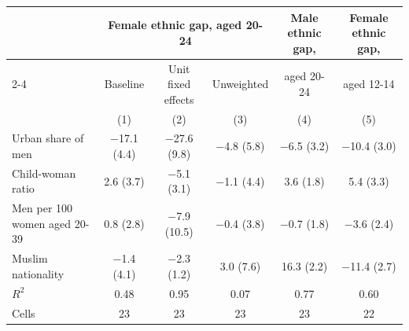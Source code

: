 \begin{tabular}{lccccc}
\toprule
 & \multicolumn{3}{c}{Female ethnic gap, aged 20-24} & Male ethnic gap, & Female ethnic gap, \\
\cmidrule(lr){2-4}
 & Baseline & Unit fixed effects & Unweighted & aged 20-24 & aged 12-14 \\
 & (1) & (2) & (3) & (4) & (5) \\
\midrule
Urban share of men & $-$17.1 (4.4) & $-$27.6 (9.8) & $-$4.8 (5.8) & $-$6.5 (3.2) & $-$10.4 (3.0) \\
Child-woman ratio & 2.6 (3.7) & $-$5.1 (3.1) & $-$1.1 (4.4) & 3.6 (1.8) & 5.4 (3.3) \\
Men per 100 women aged 20-39 & 0.8 (2.8) & $-$7.9 (10.5) & $-$0.4 (3.8) & $-$0.7 (1.8) & $-$3.6 (2.4) \\
Muslim nationality & $-$1.4 (4.1) & $-$2.3 (1.2) & 3.0 (7.6) & 16.3 (2.2) & $-$11.4 (2.7) \\
$R^2$ & 0.48 & 0.95 & 0.07 & 0.77 & 0.60 \\
Cells & 23 & 23 & 23 & 23 & 22 \\
\bottomrule
\end{tabular}
